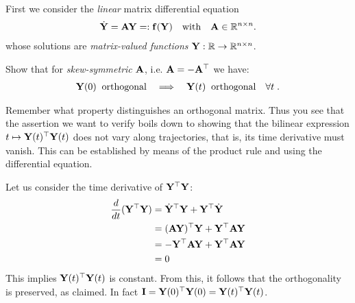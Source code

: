\begin{problem}\label{prb:matrix-diff-eq} 

First we consider the \emph{linear} matrix differential equation  
\begin{align} \label{eq:ivp_mat_A}
  \dot{{\mathbf{Y}}} = {\mathbf{A}} {\mathbf{Y}} =: {\mathbf{f}}(\mathbf{Y}) \quad \text{with} \quad {\mathbf{A}} \in
  \mathbb{R}^{n\times n}.
\end{align}
whose solutions are \emph{matrix-valued functions} ${\mathbf{Y}}: \mathbb{R} \to \mathbb{R}^{n\times n}$.

\begin{subproblem}[1] \label{sp:cons}
Show that for \emph{skew-symmetric} ${\mathbf{A}}$, i.e. ${\mathbf{A}} = - {\mathbf{A}}^\top$ we have:
\begin{align*}
  {\mathbf{Y}}(0) \:\text{ orthogonal} \quad\Longrightarrow\quad {\mathbf{Y}}(t) \:\text{
  orthogonal}\quad
  \forall t\;.
\end{align*}

\begin{hint}
  Remember what property distinguishes an orthogonal matrix. Thus you see that the
  assertion we want to verify boils down to showing that the bilinear expression
  $t\mapsto {\mathbf{Y}}(t)^{\top}{\mathbf{Y}}(t)$ does not vary along trajectories, that is, its
  time derivative must vanish. This can be established by means of the product
  rule  and using the differential equation.
\end{hint}

\begin{solution}
Let us consider the time derivative of ${\mathbf{Y}}^\top {\mathbf{Y}}$:
\begin{align*}
  \frac{d}{dt}({\mathbf{Y}}^\top {\mathbf{Y}})& = \dot{{\mathbf{Y}}}^\top {\mathbf{Y}} +
                              {\mathbf{Y}}^\top \dot{{\mathbf{Y}}} \\
                            & = ({\mathbf{A}} {\mathbf{Y}})^\top {\mathbf{Y}} + {\mathbf{Y}}^\top
                              {\mathbf{A}} {\mathbf{Y}} \\
                            &= - {\mathbf{Y}}^\top {\mathbf{A}} {\mathbf{Y}} + {\mathbf{Y}} ^\top {\mathbf{A}} {\mathbf{Y}} \\
                            &= 0
\end{align*}
This implies ${\mathbf{Y}}(t)^\top {\mathbf{Y}}(t)$ is constant. From this, it follows that the orthogonality is preserved, as claimed. In fact $\mathbf{I} = {\mathbf{Y}}(0)^\top {\mathbf{Y}}(0) = {\mathbf{Y}}(t)^\top {\mathbf{Y}}(t)$.
\end{solution}

\end{subproblem}


\end{problem}
